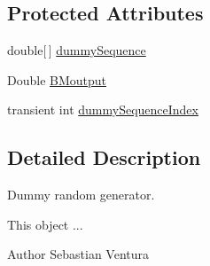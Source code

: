 \subsection*{Protected Attributes}
\begin{DoxyCompactItemize}
\item 
double\mbox{[}$\,$\mbox{]} \hyperlink{classnet_1_1sf_1_1jclec_1_1util_1_1random_1_1_dummy_rand_gen_a1b46d8d65c07d375a79cb47e93047bde}{dummy\-Sequence}
\item 
Double \hyperlink{classnet_1_1sf_1_1jclec_1_1util_1_1random_1_1_dummy_rand_gen_a5c42bd5cadb8dd6471441d1f85665d56}{B\-Moutput}
\item 
transient int \hyperlink{classnet_1_1sf_1_1jclec_1_1util_1_1random_1_1_dummy_rand_gen_ad14fb3cc2b1564fd4358239aa06dca1d}{dummy\-Sequence\-Index}
\end{DoxyCompactItemize}


\subsection{Detailed Description}
Dummy random generator.

This object ...

\begin{DoxyAuthor}{Author}
Sebastian Ventura 
\end{DoxyAuthor}


